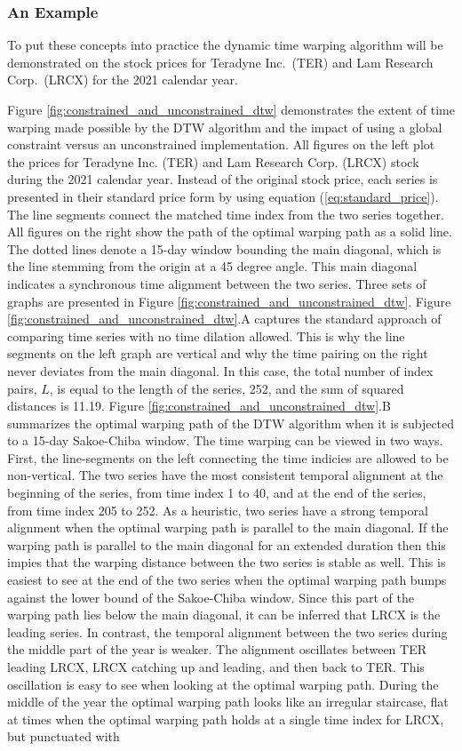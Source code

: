 \subsubsection{An Example}

To put these concepts into practice the dynamic time warping algorithm will be demonstrated on the stock prices for Teradyne Inc.\ (TER) and Lam Research Corp.\ (LRCX) for the 2021 calendar year. 

Figure \ref{fig:constrained_and_unconstrained_dtw} demonstrates the extent of time warping made possible by the DTW algorithm and the impact of using a global constraint versus an unconstrained implementation. All figures on the left plot the prices for Teradyne Inc. (TER) and Lam Research Corp. (LRCX) stock during the 2021 calendar year. Instead of the original stock price, each series is presented in their standard price form by using equation (\ref{eq:standard_price}). The line segments connect the matched time index from the two series together. All figures on the right show the path of the optimal warping path as a solid line. The dotted lines denote a 15-day window bounding the main diagonal, which is the line stemming from the origin at a 45 degree angle. This main diagonal indicates a synchronous time alignment between the two series. Three sets of graphs are presented in Figure \ref{fig:constrained_and_unconstrained_dtw}. Figure \ref{fig:constrained_and_unconstrained_dtw}.A captures the standard approach of comparing time series with no time dilation allowed. This is why the line segments on the left graph are vertical and why the time pairing on the right never deviates from the main diagonal. In this case, the total number of index pairs, $L$, is equal to the length of the series, 252, and the sum of squared distances is 11.19. Figure \ref{fig:constrained_and_unconstrained_dtw}.B summarizes the optimal warping path of the DTW algorithm when it is subjected to a 15-day Sakoe-Chiba window. The time warping can be viewed in two ways. First, the line-segments on the left connecting the time indicies are allowed to be non-vertical. The two series have the most consistent temporal alignment at the beginning of the series, from time index 1 to 40, and at the end of the series, from time index 205 to 252. As a heuristic, two series have a strong temporal alignment when the optimal warping path is parallel to the main diagonal. If the warping path is parallel to the main diagonal for an extended duration then this impies that the warping distance between the two series is stable as well. This is easiest to see at the end of the two series when the optimal warping path bumps against the lower bound of the Sakoe-Chiba window. Since this part of the warping path lies below the main diagonal, it can be inferred that LRCX is the leading series. In contrast, the temporal alignment between the two series during the middle part of the year is weaker. The alignment oscillates between TER leading LRCX, LRCX catching up and leading, and then back to TER. This oscillation is easy to see when looking at the optimal warping path. During the middle of the year the optimal warping path looks like an irregular staircase, flat at times when the optimal warping path holds at a single time index for LRCX, but punctuated with 